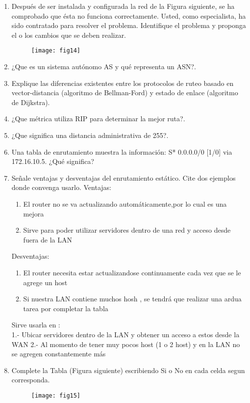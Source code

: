 \documentclass{udparticle}
\begin{document}
\begin{enumerate}
\item Después de ser instalada y configurada la red de la Figura siguiente, se ha 
comprobado que ésta no funciona correctamente. Usted, como especialista, ha sido 
contratado para resolver el problema. Identifique el problema y proponga el o los 
cambios que se deben realizar.
	\begin{figure}[H]
	\centering
	\texttt{[image: fig14]}
	\end{figure}

\item ¿Que es un sistema autónomo AS y qué representa un ASN?.
\item Explique las diferencias existentes entre los protocolos de ruteo basado en
vector-distancia (algoritmo de Bellman-Ford) y estado de enlace (algoritmo de Dijkstra).

\item ¿Que métrica utiliza RIP para determinar la mejor ruta?.
\item ¿Que significa una distancia administrativa de 255?.
\item Una tabla de enrutamiento muestra la información: S* 0.0.0.0/0 [1/0] via 172.16.10.5. ¿Qué significa?
\item Señale ventajas y desventajas del enrutamiento estático. Cite dos ejemplos donde convenga usarlo.
Ventajas:
\begin{enumerate}
\item El router no se va actualizando automáticamente,por lo cual es una mejora
\item Sirve para poder utilizar servidores dentro de una red y acceso desde fuera de la LAN
\end{enumerate}
Desventajas:
\begin{enumerate}
\item  El router necesita estar actualizandose continuamente cada vez que se le agrege un host 
\item  Si nuestra LAN contiene muchos hosh , se tendrá que realizar una ardua tarea por completar la tabla
\end{enumerate}
Sirve usarla en :\\
1.- Ubicar servidores dentro de la LAN y obtener un acceso a estos desde la WAN
2.- Al momento de tener muy pocos host (1 o 2 host) y en la LAN no se agregen constantemente más
\item Complete la Tabla (Figura siguiente) escribiendo Si o No en cada celda segun corresponda.
	\begin{figure}[H]
	\centering
	\texttt{[image: fig15]}
	\end{figure}


\end{enumerate}
\end{document}
